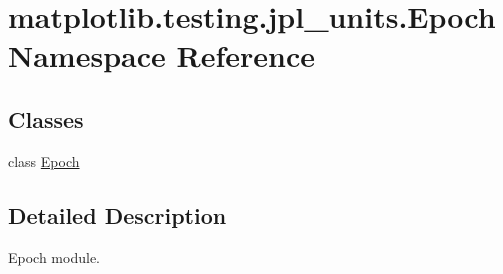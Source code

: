 \hypertarget{namespacematplotlib_1_1testing_1_1jpl__units_1_1Epoch}{}\section{matplotlib.\+testing.\+jpl\+\_\+units.\+Epoch Namespace Reference}
\label{namespacematplotlib_1_1testing_1_1jpl__units_1_1Epoch}
\subsection*{Classes}
\begin{DoxyCompactItemize}
\item 
class \hyperlink{classmatplotlib_1_1testing_1_1jpl__units_1_1Epoch_1_1Epoch}{Epoch}
\end{DoxyCompactItemize}


\subsection{Detailed Description}
\begin{DoxyVerb}Epoch module.\end{DoxyVerb}
 